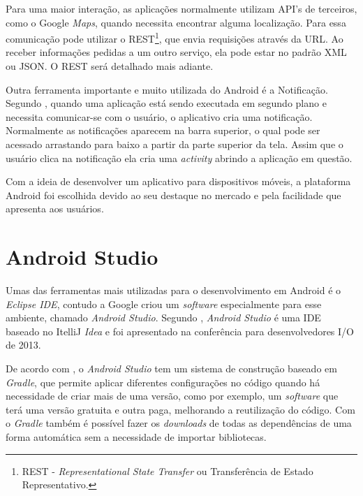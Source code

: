	\par Para uma maior interação, as aplicações normalmente utilizam API’s de
terceiros, como o Google \textit{Maps}, quando necessita encontrar alguma
localização. Para  essa comunicação pode utilizar o
REST\footnote{REST - \textit{Representational State Transfer} ou Transferência
de Estado Representativo.}, que envia requisições através da URL. Ao receber
informações pedidas a um outro serviço, ela pode estar no padrão XML ou JSON. O
REST será detalhado mais adiante.

	\par Outra ferramenta importante e muito utilizada do Android é a Notificação.
Segundo , quando uma aplicação está sendo executada em
segundo plano e necessita comunicar-se com o usuário, o aplicativo cria uma
notificação. Normalmente as notificações aparecem na barra superior, o qual
pode ser acessado arrastando para baixo a partir da parte superior da tela.
Assim que o usuário clica na notificação ela cria uma \textit{activity} abrindo
a aplicação em questão.

	\par Com a ideia de desenvolver um aplicativo para dispositivos móveis, a
plataforma Android foi escolhida devido ao seu destaque no mercado e pela
facilidade que apresenta aos usuários.

\section{Android Studio}

	\par Umas das ferramentas mais utilizadas para o desenvolvimento em Android é o
\textit{Eclipse IDE}, contudo a Google criou um \textit{software} especialmente
para esse ambiente, chamado \textit{Android Studio}. Segundo
, \textit{Android Studio} é uma IDE baseado no ItelliJ
\textit{Idea} e foi apresentado na conferência para desenvolvedores I/O de 2013.

	\par De acordo com , o \textit{Android Studio} tem um
sistema de construção baseado em \textit{Gradle}, que permite aplicar
diferentes configurações no código quando há necessidade de criar mais de uma
versão, como por exemplo, um \textit{software} que terá uma versão gratuita e
outra paga, melhorando a reutilização do código. Com o \textit{Gradle} também é
possível fazer os \textit{downloads} de todas as dependências de uma forma
automática sem a necessidade de importar bibliotecas.

